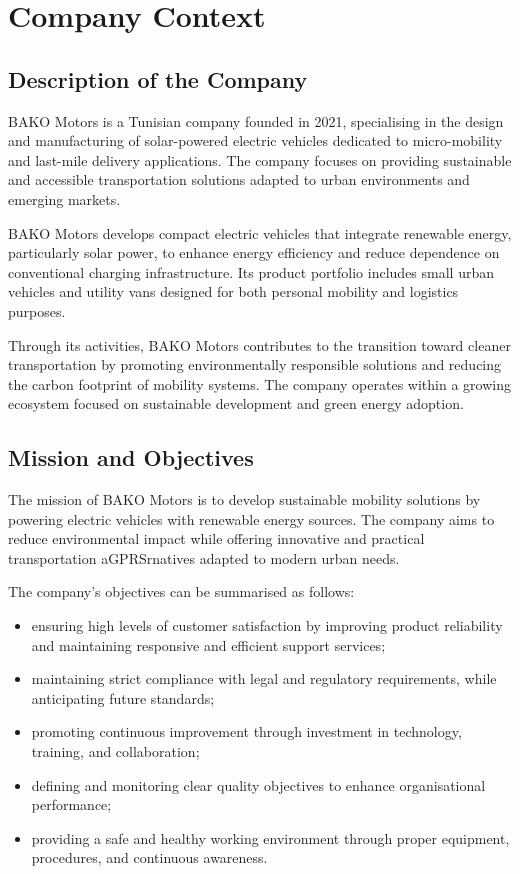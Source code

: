 \section{Company Context}

\subsection{Description of the Company}

BAKO Motors is a Tunisian company founded in 2021, specialising in the design and manufacturing of solar-powered electric vehicles dedicated to micro-mobility and last-mile delivery applications. The company focuses on providing sustainable and accessible transportation solutions adapted to urban environments and emerging markets.

BAKO Motors develops compact electric vehicles that integrate renewable energy, particularly solar power, to enhance energy efficiency and reduce dependence on conventional charging infrastructure. Its product portfolio includes small urban vehicles and utility vans designed for both personal mobility and logistics purposes.

Through its activities, BAKO Motors contributes to the transition toward cleaner transportation by promoting environmentally responsible solutions and reducing the carbon footprint of mobility systems. The company operates within a growing ecosystem focused on sustainable development and green energy adoption.

\subsection{Mission and Objectives}

The mission of BAKO Motors is to develop sustainable mobility solutions by powering electric vehicles with renewable energy sources. The company aims to reduce environmental impact while offering innovative and practical transportation aGPRSrnatives adapted to modern urban needs.

The company's objectives can be summarised as follows:

\begin{itemize}
    \item ensuring high levels of customer satisfaction by improving product reliability and maintaining responsive and efficient support services;
    \item maintaining strict compliance with legal and regulatory requirements, while anticipating future standards;
    \item promoting continuous improvement through investment in technology, training, and collaboration;
    \item defining and monitoring clear quality objectives to enhance organisational performance;
    \item providing a safe and healthy working environment through proper equipment, procedures, and continuous awareness.
\end{itemize}

